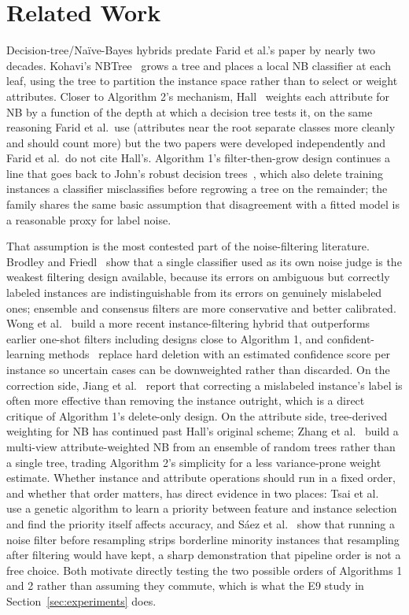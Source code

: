 \section{Related Work}

Decision-tree/Na\"ive-Bayes hybrids predate Farid et al.'s paper by nearly
two decades. Kohavi's NBTree~\cite{kohavi1996scaling} grows a tree and
places a local NB classifier at each leaf, using the tree to partition the
instance space rather than to select or weight attributes. Closer to
Algorithm 2's mechanism, Hall~\cite{hall2007decision} weights each
attribute for NB by a function of the depth at which a decision tree
tests it, on the same reasoning Farid et al.\ use (attributes near the
root separate classes more cleanly and should count more) but the two
papers were developed independently and Farid et al.\ do not cite
Hall's. Algorithm 1's filter-then-grow design continues a line that goes
back to John's robust decision
trees~\cite{john1995robust}, which also delete training instances a
classifier misclassifies before regrowing a tree on the remainder; the
family shares the same basic assumption that disagreement with a fitted
model is a reasonable proxy for label noise.

That assumption is the most contested part of the noise-filtering
literature. Brodley and Friedl~\cite{brodley1999identifying} show that a
single classifier used as its own noise judge is the weakest filtering
design available, because its errors on ambiguous but correctly labeled
instances are indistinguishable from its errors on genuinely mislabeled
ones; ensemble and consensus filters are more conservative and better
calibrated. Wong et al.~\cite{wong2020instance} build a more recent
instance-filtering hybrid that outperforms earlier one-shot filters
including designs close to Algorithm 1, and confident-learning
methods~\cite{northcutt2021confident} replace hard deletion with an
estimated confidence score per instance so uncertain cases can be
downweighted rather than discarded. On the correction side, Jiang et
al.~\cite{jiang2024correction} report that correcting a mislabeled
instance's label is often more effective than removing the instance
outright, which is a direct critique of Algorithm 1's delete-only design.
On the attribute side, tree-derived weighting for NB has continued past
Hall's original scheme; Zhang et al.~\cite{zhang2023multiview} build a
multi-view attribute-weighted NB from an ensemble of random trees rather
than a single tree, trading Algorithm 2's simplicity for a less
variance-prone weight estimate. Whether instance and attribute operations
should run in a fixed order, and whether that order matters, has direct
evidence in two places: Tsai et al.~\cite{tsai2013genetic} use a genetic
algorithm to learn a priority between feature and instance selection and
find the priority itself affects accuracy, and S\'aez et
al.~\cite{saez2015smoteipf} show that running a noise filter before
resampling strips borderline minority instances that resampling after
filtering would have kept, a sharp demonstration that pipeline order is
not a free choice. Both motivate directly testing the two possible orders
of Algorithms 1 and 2 rather than assuming they commute, which is what
the E9 study in Section~\ref{sec:experiments} does.

